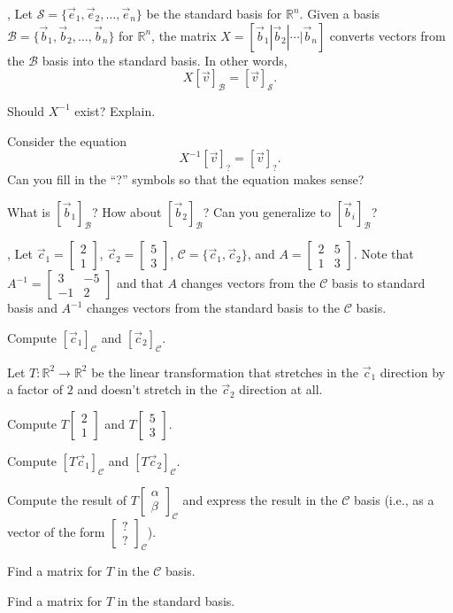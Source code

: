 \documentclass[letter]{article}
\newcommand{\R}{\mathbb{R}}
\newcommand{\mat}[1]{\begin{bmatrix}#1\end{bmatrix}}
\renewcommand{\emph}[1]{{\color{defcolor} \textbf{\textit{##1}}}}
\begin{document}
	
	\sep
	Let $\mathcal S=\{\vec e_1,\vec e_2,\ldots,\vec e_n\}$ be the standard basis for $\R^n$.
	Given a basis $\mathcal B=\{\vec b_1,\vec b_2,\ldots,\vec b_n\}$ for $\R^n$, the 
	matrix $X=[\vec b_1|\vec b_2|\cdots|\vec b_n]$ converts
	vectors from the $\mathcal B$ basis into the standard basis.  In other words,
	\[
		X[\vec v]_{\mathcal B} = [\vec v]_{\mathcal S}.
	\]
	\vspace{-1cm}
	\begin{Enum}
		\item Should $X^{-1}$ exist? Explain.
		\item Consider the equation\[
				X^{-1}[\vec v]_{?} = [\vec v]_{?}.
			\]
			Can you fill in the ``?'' symbols so that the equation makes sense?
		\item What is $[\vec b_1]_{\mathcal B}$?  How about $[\vec b_2]_{\mathcal B}$?  Can
			you generalize to $[\vec b_i]_{\mathcal B}$?
	\end{Enum}

	\sep
	Let $\vec c_1=\mat{2\\1}$, $\vec c_2=\mat{5\\3}$, $\mathcal C=\{\vec c_1,\vec c_2\}$, and $A=\mat{2&5\\1&3}$.
	Note that $A^{-1}=\mat{3&-5\\-1&2}$ and that $A$ changes vectors from the $\mathcal C$ basis to standard
	basis and $A^{-1}$ changes vectors from the standard basis to the $\mathcal C$ basis.
	\begin{Enum}
		\item Compute $[\vec c_1]_{\mathcal C}$ and $[\vec c_2]_{\mathcal C}$.
	\end{Enum}
	Let $T:\R^2\to\R^2$ be the linear transformation that stretches in the $\vec c_1$ direction by a factor of $2$
	and doesn't stretch in the $\vec c_2$ direction at all.
	\begin{Enum}[resume]
		\item Compute $T\mat{2\\1}$ and $T\mat{5\\3}$.
		\item Compute $[T\vec c_1]_{\mathcal C}$ and $[T\vec c_2]_{\mathcal C}$.
		\item Compute the result of $T\mat{\alpha\\\beta}_{\mathcal C}$ and express the result in the
			$\mathcal C$ basis (i.e., as a vector of the form $\mat{?\\?}_{\mathcal C}$).
		\item Find a matrix for $T$ in the $\mathcal C$ basis.
		\item Find a matrix for $T$ in the standard basis.
	\end{Enum}
\end{document}
